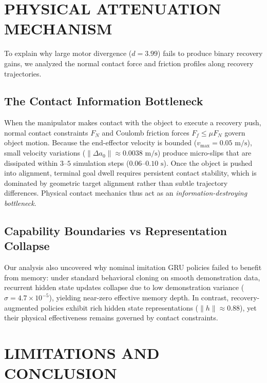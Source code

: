 \documentclass[letterpaper, 10 pt, conference]{ieeeconf}
\begin{document}
\section{PHYSICAL ATTENUATION MECHANISM}
\label{sec:mechanism}

To explain why large motor divergence ($d = 3.99$) fails to produce binary recovery gains, we analyzed the normal contact force and friction profiles along recovery trajectories.

\subsection{The Contact Information Bottleneck}
When the manipulator makes contact with the object to execute a recovery push, normal contact constraints $F_N$ and Coulomb friction forces $F_f \le \mu F_N$ govern object motion. Because the end-effector velocity is bounded ($v_{\text{max}} = 0.05\text{ m/s}$), small velocity variations ($\|\Delta a_0\| \approx 0.0038\text{ m/s}$) produce micro-slips that are dissipated within $3\text{--}5$ simulation steps ($0.06\text{--}0.10\text{ s}$). Once the object is pushed into alignment, terminal goal dwell requires persistent contact stability, which is dominated by geometric target alignment rather than subtle trajectory differences. Physical contact mechanics thus act as an \emph{information-destroying bottleneck}.

\subsection{Capability Boundaries vs Representation Collapse}
Our analysis also uncovered why nominal imitation GRU policies failed to benefit from memory: under standard behavioral cloning on smooth demonstration data, recurrent hidden state updates collapse due to low demonstration variance ($\sigma = 4.7 \times 10^{-5}$), yielding near-zero effective memory depth. In contrast, recovery-augmented policies exhibit rich hidden state representations ($\|h\| \approx 0.88$), yet their physical effectiveness remains governed by contact constraints.

\section{LIMITATIONS AND CONCLUSION}
\label{sec:limitations}
\end{document}
